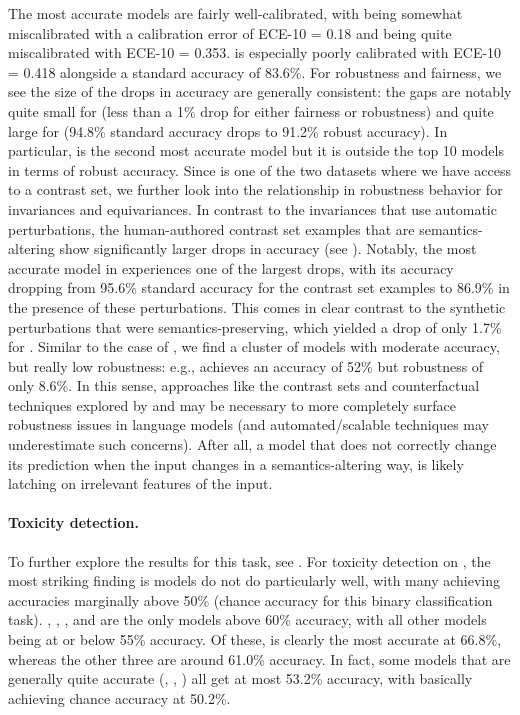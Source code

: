 The most accurate models are fairly well-calibrated, with \glm being somewhat miscalibrated with a calibration error of ECE-10 = 0.18 and \bloom being quite miscalibrated with ECE-10 = 0.353.
\yalm is especially poorly calibrated with ECE-10 = 0.418 alongside a standard accuracy of 83.6\%. 
For robustness and fairness, we see the size of the drops in accuracy are generally consistent: the gaps are notably quite small for \instructdavinci (less than a 1\% drop for either fairness or robustness) and quite large for \gptneox (94.8\% standard accuracy drops to 91.2\% robust accuracy). 
In particular, \gptneox is the second most accurate model but it is outside the top 10 models in terms of robust accuracy. 
Since \imdb is one of the two datasets where we have access to a contrast set, we further look into the relationship in robustness behavior for invariances and equivariances.
In contrast to the invariances that use automatic perturbations, the human-authored contrast set examples that are semantics-altering show significantly larger drops in accuracy (see ). 
Notably, the most accurate model in \glm experiences one of the largest drops, with its accuracy dropping from 95.6\% standard accuracy for the contrast set examples to 86.9\% in the presence of these perturbations.
This comes in clear contrast to the synthetic perturbations that were semantics-preserving, which yielded a drop of only 1.7\% for \glm. 
Similar to the case of \boolq, we find a cluster of models with moderate accuracy, but really low robustness: e.g., \gptbabbage achieves an accuracy of 52\% but robustness of only 8.6\%.
In this sense, approaches like the contrast sets and counterfactual techniques explored by \citet{kaushik2019learning} and \citet{gardner2020contrast} may be necessary to more completely surface robustness issues in language models (and automated/scalable techniques may underestimate such concerns). 
After all, a model that does not correctly change its prediction when the input changes in a semantics-altering way, is likely latching on irrelevant features of the input.

\paragraph{Toxicity detection.}
To further explore the results for this task, see .
For toxicity detection on \civilcomments, the most striking finding is models do not do particularly well, with many achieving accuracies marginally above 50\% (\ie chance accuracy for this binary classification task). 
\anthropic, \bloom, \mtnlgfivethreezero, and \instructdavinci are the only models above 60\% accuracy, with all other models being at or below 55\% accuracy.
Of these, \instructdavinci is clearly the most accurate at 66.8\%, whereas the other three are around 61.0\% accuracy. 
In fact, some models that are generally quite accurate (\eg \coherexl, \optonesevenfive, \gptdavinci) all get at most 53.2\% accuracy, with \optonesevenfive basically achieving chance accuracy at 50.2\%. 

